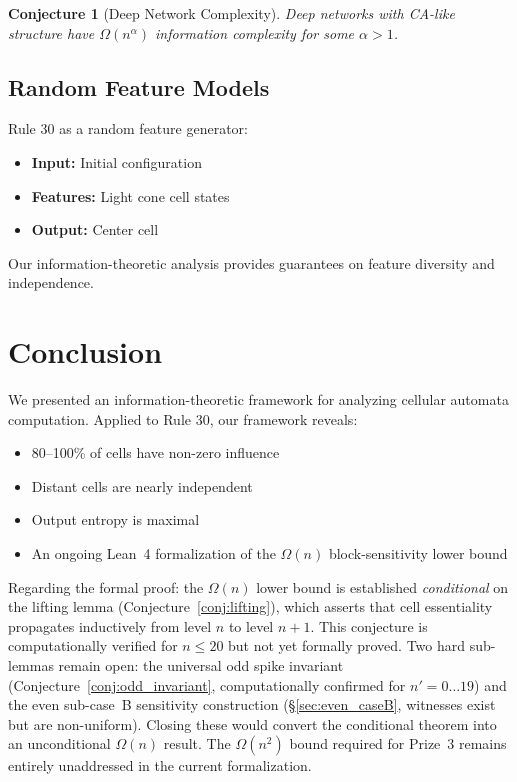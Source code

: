 \documentclass[11pt]{article}
\newtheorem{conjecture}[theorem]{Conjecture}
\begin{document}
\begin{conjecture}[Deep Network Complexity]
Deep networks with CA-like structure have $\Omega(n^\alpha)$ information complexity for some $\alpha > 1$.
\end{conjecture}

\subsection{Random Feature Models}

Rule 30 as a random feature generator:
\begin{itemize}
    \item \textbf{Input:} Initial configuration
    \item \textbf{Features:} Light cone cell states
    \item \textbf{Output:} Center cell
\end{itemize}

Our information-theoretic analysis provides guarantees on feature diversity and independence.

\section{Conclusion}

We presented an information-theoretic framework for analyzing cellular automata computation. Applied to Rule 30, our framework reveals:
\begin{itemize}
    \item 80--100\% of cells have non-zero influence
    \item Distant cells are nearly independent
    \item Output entropy is maximal
    \item An ongoing Lean~4 formalization of the $\Omega(n)$ block-sensitivity lower bound
\end{itemize}

Regarding the formal proof: the $\Omega(n)$ lower bound is established \emph{conditional} on the lifting lemma (Conjecture~\ref{conj:lifting}), which asserts that cell essentiality propagates inductively from level $n$ to level $n+1$. This conjecture is computationally verified for $n \leq 20$ but not yet formally proved. Two hard sub-lemmas remain open: the universal odd spike invariant (Conjecture~\ref{conj:odd_invariant}, computationally confirmed for $n' = 0\ldots19$) and the even sub-case~B sensitivity construction (\S\ref{sec:even_caseB}, witnesses exist but are non-uniform). Closing these would convert the conditional theorem into an unconditional $\Omega(n)$ result. The $\Omega(n^2)$ bound required for Prize~3 remains entirely unaddressed in the current formalization.
\end{document}
